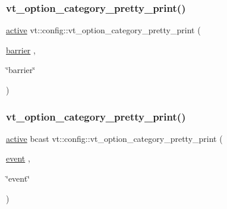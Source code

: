 \subsubsection{\texorpdfstring{vt\+\_\+option\+\_\+category\+\_\+pretty\+\_\+print()}{vt\_option\_category\_pretty\_print()}\hspace{0.1cm}{\footnotesize\ttfamily [2/16]}}
{\footnotesize\ttfamily \hyperlink{namespacevt_1_1config_a6bd1d6215bda0d8ca02811798399f689a82f77c67af0c363709010c6df4dbd920}{active} vt\+::config\+::vt\+\_\+option\+\_\+category\+\_\+pretty\+\_\+print (\begin{DoxyParamCaption}\item[{\hyperlink{namespacevt_1_1config_a6bd1d6215bda0d8ca02811798399f689a39d4d58fa73c76f6cb97e6dc20e0d1c0}{barrier}}]{,  }\item[{\char`\"{}barrier\char`\"{}}]{ }\end{DoxyParamCaption})}

\mbox{\label{namespacevt_1_1config_adc18d97d304941c901a2d06015ac4624}} 
\subsubsection{\texorpdfstring{vt\+\_\+option\+\_\+category\+\_\+pretty\+\_\+print()}{vt\_option\_category\_pretty\_print()}\hspace{0.1cm}{\footnotesize\ttfamily [3/16]}}
{\footnotesize\ttfamily \hyperlink{namespacevt_1_1config_a6bd1d6215bda0d8ca02811798399f689a82f77c67af0c363709010c6df4dbd920}{active} bcast vt\+::config\+::vt\+\_\+option\+\_\+category\+\_\+pretty\+\_\+print (\begin{DoxyParamCaption}\item[{\hyperlink{namespacevt_1_1config_a6bd1d6215bda0d8ca02811798399f689a9e0b3f734ed730f6f3117f0687eda7df}{event}}]{,  }\item[{\char`\"{}event\char`\"{}}]{ }\end{DoxyParamCaption})}

\mbox{\label{namespacevt_1_1config_a0f63a89d62d66caeff4d5b7a8a760eb1}} 
